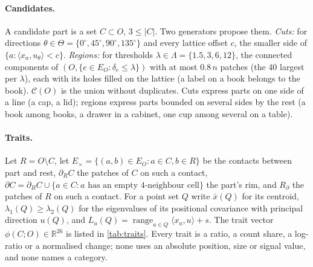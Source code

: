 \documentclass[10pt]{article}
\newcommand{\R}{\mathbb{R}}
\newcommand{\cand}{\mathcal{C}}
\DeclareMathOperator{\range}{range}
\begin{document}
\paragraph{Candidates.} A candidate part is a set $C\subset O$, $3\le|C|$. Two generators propose them.
\emph{Cuts:} for directions $\theta\in\Theta=\{0^\circ,45^\circ,90^\circ,135^\circ\}$ and every lattice offset $c$, the smaller side of $\{a:\langle x_a,u_\theta\rangle<c\}$.
\emph{Regions:} for thresholds $\lambda\in\Lambda=\{1.5,3,6,12\}$, the connected components of $(O,\{e\in E_O:\delta_e\le\lambda\})$ with at most $0.8\,n$ patches (the 40 largest per $\lambda$), each with its holes filled on the lattice (a label on a book belongs to the book). $\cand(O)$ is the union without duplicates. Cuts express parts on one side of a line (a cap, a lid); regions express parts bounded on several sides by the rest (a book among books, a drawer in a cabinet, one cup among several on a table).

\paragraph{Traits.} Let $R=O\setminus C$, let $E_\times=\{(a,b)\in E_O:a\in C,b\in R\}$ be the contacts between part and rest, $\partial_RC$ the patches of $C$ on such a contact, $\partial C=\partial_RC\cup\{a\in C:a\text{ has an empty 4-neighbour cell}\}$ the part's rim, and $R_\partial$ the patches of $R$ on such a contact. For a point set $Q$ write $\bar x(Q)$ for its centroid, $\lambda_1(Q)\ge\lambda_2(Q)$ for the eigenvalues of its positional covariance with principal direction $u(Q)$, and $L_u(Q)=\range_{a\in Q}\langle x_a,u\rangle+s$. The trait vector $\phi(C;O)\in\R^{26}$ is listed in \cref{tab:traits}. Every trait is a ratio, a count share, a log-ratio or a normalised change; none uses an absolute position, size or signal value, and none names a category.
\end{document}
